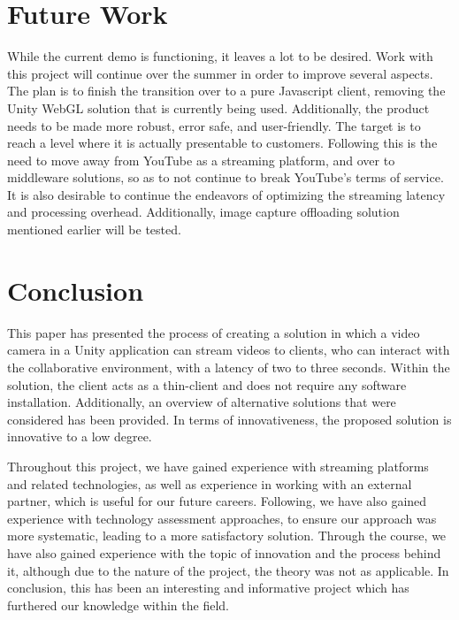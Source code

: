 \section{Future Work}
While the current demo is functioning, it leaves a lot to be desired. Work with this project will continue over the summer in order to improve several aspects. The plan is to finish the transition over to a pure Javascript client, removing the Unity WebGL solution that is currently being used. Additionally, the product needs to be made more robust, error safe, and user-friendly. The target is to reach a level where it is actually presentable to customers.
Following this is the need to move away from YouTube as a streaming platform, and over to middleware solutions, so as to not continue to break YouTube's terms of service.
It is also desirable to continue the endeavors of optimizing the streaming latency and processing overhead. Additionally, image capture offloading solution mentioned earlier will be tested.

\section{Conclusion}
This paper has presented the process of creating a solution in which a video camera in a Unity application can stream videos to clients, who can interact with the collaborative environment, with a latency of two to three seconds. Within the solution, the client acts as a thin-client and does not require any software installation. Additionally, an overview of alternative solutions that were considered has been provided. In terms of innovativeness, the proposed solution is innovative to a low degree.

Throughout this project, we have gained experience with streaming platforms and related technologies, as well as experience in working with an external partner, which is useful for our future careers. Following, we have also gained experience with technology assessment approaches, to ensure our approach was more systematic, leading to a more satisfactory solution. Through the course, we have also gained experience with the topic of innovation and the process behind it, although due to the nature of the project, the theory was not as applicable.
In conclusion, this has been an interesting and informative project which has furthered our knowledge within the field.
